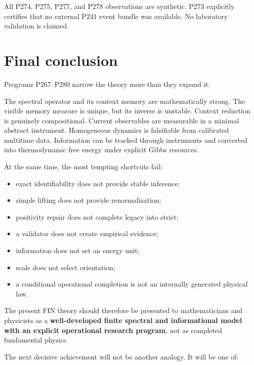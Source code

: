\documentclass[11pt,a4paper,openany]{report}
\begin{document}
All P274, P275, P277, and P278 observations are synthetic. P273 explicitly certifies that no external P241 event bundle was available. No laboratory validation is claimed.

\chapter{Final conclusion}

Programs P267--P280 narrow the theory more than they expand it.

The spectral operator and its context memory are mathematically strong. The visible memory measure is unique, but its inverse is unstable. Context reduction is genuinely compositional. Current observables are measurable in a minimal abstract instrument. Homogeneous dynamics is falsifiable from calibrated multitime data. Information can be tracked through instruments and converted into thermodynamic free energy under explicit Gibbs resources.

At the same time, the most tempting shortcuts fail:

\begin{itemize}
\item 
exact identifiability does not provide stable inference;

\item 
simple lifting does not provide renormalization;

\item 
positivity repair does not complete legacy into strict;

\item 
a validator does not create empirical evidence;

\item 
information does not set an energy unit;

\item 
scale does not select orientation;

\item 
a conditional operational completion is not an internally generated physical law.

\end{itemize}

The present FIN theory should therefore be presented to mathematicians and physicists as a \textbf{well-developed finite spectral and informational model with an explicit operational research program}, not as completed fundamental physics.

The next decisive achievement will not be another analogy. It will be one of:
\end{document}
